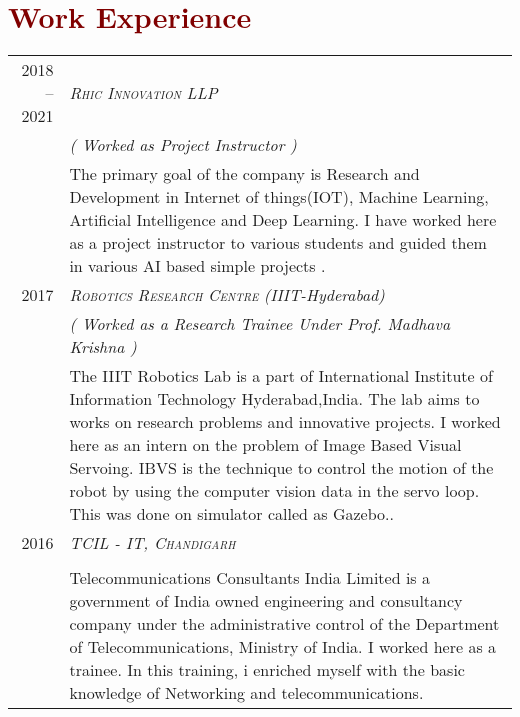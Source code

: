 \documentclass[a4paper,11pt]{article}
\begin{document}
\section{\textcolor{Maroon}{Work Experience}}
\vspace{2mm}
\begin{tabular}{r|p{13cm}}
 \textsc{2018 -- 2021} & \emph{{\Large{\textsc{Rhic Innovation LLP}}}} \\& \emph{( Worked as Project Instructor ) }\\ & \small{The primary goal of the company is Research and Development  in Internet of things(IOT), Machine Learning, Artificial Intelligence and Deep Learning. I have worked here as a project instructor to various students and guided them in various AI based simple projects .}
 \vspace{3mm}\\
 \textsc{2017} & \emph{{\Large{\textsc{Robotics Research Centre}}}} \emph{(IIIT-Hyderabad)} \\& \emph{( Worked as a Research Trainee Under Prof. Madhava Krishna ) }\\ & \small{The IIIT Robotics Lab is a part of International Institute of Information Technology Hyderabad,India. The lab aims to works on research problems and innovative projects. I worked here as an intern on the problem of Image Based Visual Servoing. IBVS is the technique to control the motion of the robot by using the computer vision data in the servo loop. This was done on simulator called as Gazebo..}
 \vspace{3mm}\\
 \textsc{2016} & \emph{{\Large{\textsc{TCIL - IT, Chandigarh}}}}\\ & { ( \emph{Internship Program} )\\ & \small{ Telecommunications Consultants India Limited is a government of India owned engineering and consultancy company under the administrative control of the Department of Telecommunications, Ministry of India. I worked here as a trainee. In this training, i enriched myself with the basic knowledge of Networking and telecommunications.}}
\end{tabular}
\end{document}
